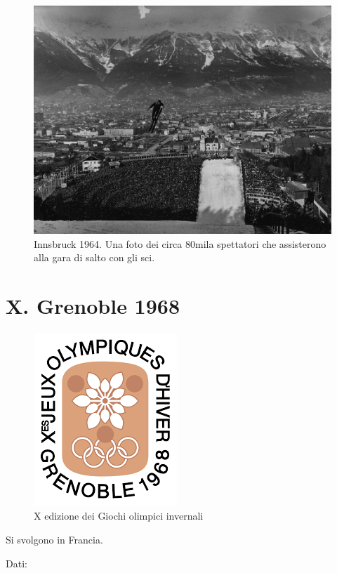 \documentclass[
]{book}
\begin{document}
\begin{figure}
\includegraphics[width=0.8\linewidth]{images/ArteVitae/1964(2)} \caption{Innsbruck 1964. Una foto dei circa 80mila spettatori che assisterono alla gara di salto con gli sci.}\label{fig:unnamed-chunk-27}
\end{figure}

\chapter*{X. Grenoble 1968}\label{x.-grenoble-1968}

\begin{figure}
\includegraphics[width=0.4\linewidth]{images/loghi/1968} \caption{X edizione dei Giochi olimpici invernali}\label{fig:unnamed-chunk-28}
\end{figure}

Si svolgono in Francia.

Dati:
\end{document}
